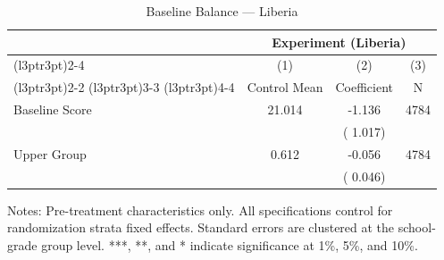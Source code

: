 \begin{table}[!h]
\centering
\caption{Baseline Balance --- Liberia}
\label{tab:lib_balance}
\begin{threeparttable}
\begin{tabular}[t]{lccc}
\toprule
\multicolumn{1}{c}{ } & \multicolumn{3}{c}{Experiment (Liberia)} \\
\cmidrule(l{3pt}r{3pt}){2-4}
\multicolumn{1}{c}{ } & \multicolumn{1}{c}{(1)} & \multicolumn{1}{c}{(2)} & \multicolumn{1}{c}{(3)} \\
\cmidrule(l{3pt}r{3pt}){2-2} \cmidrule(l{3pt}r{3pt}){3-3} \cmidrule(l{3pt}r{3pt}){4-4}
 & Control Mean & Coefficient & N \\
\midrule
Baseline Score &  21.014 &  -1.136 & 4784 \\
 & & (  1.017) & \\
Upper Group &   0.612 &  -0.056 & 4784 \\
 & & (  0.046) & \\
\bottomrule
\end{tabular}
\begin{tablenotes}[para]
\item Notes: Pre-treatment characteristics only. All specifications control for randomization strata fixed effects. Standard errors are clustered at the school-grade group level. ***, **, and * indicate significance at 1\%, 5\%, and 10\%.
\end{tablenotes}
\end{threeparttable}
\end{table}
